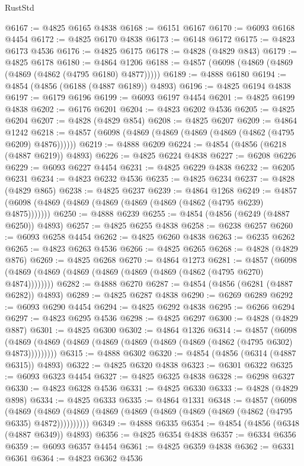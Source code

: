 \begin{lexlean}{RustStd}
\begin{coremodule}
@6167 := @4825 @6165 @4838
@6168 := @6151 @6167
@6170 := @6093 @6168 @4454
@6172 := @4825 @6170 @4838
@6173 := @6148 @6172
@6175 := @4823 @6173 @4536
@6176 := @4825 @6175
@6178 := @4828 (@4829 @843)
@6179 := @4825 @6178
@6180 := @4864 @1206
@6188 := @4857 (@6098 (@4869 (@4869 (@4869 (@4862 (@4795 @6180) @4877)))))
@6189 := @4888 @6180
@6194 := @4854 (@4856 (@6188 (@4887 @6189)) @4893)
@6196 := @4825 @6194 @4838
@6197 := @6179 @6196
@6199 := @6093 @6197 @4454
@6201 := @4825 @6199 @4838
@6202 := @6176 @6201
@6204 := @4823 @6202 @4536
@6205 := @4825 @6204
@6207 := @4828 (@4829 @854)
@6208 := @4825 @6207
@6209 := @4864 @1242
@6218 := @4857 (@6098 (@4869 (@4869 (@4869 (@4869 (@4862 (@4795 @6209) @4876))))))
@6219 := @4888 @6209
@6224 := @4854 (@4856 (@6218 (@4887 @6219)) @4893)
@6226 := @4825 @6224 @4838
@6227 := @6208 @6226
@6229 := @6093 @6227 @4454
@6231 := @4825 @6229 @4838
@6232 := @6205 @6231
@6234 := @4823 @6232 @4536
@6235 := @4825 @6234
@6237 := @4828 (@4829 @865)
@6238 := @4825 @6237
@6239 := @4864 @1268
@6249 := @4857 (@6098 (@4869 (@4869 (@4869 (@4869 (@4869 (@4862 (@4795 @6239) @4875)))))))
@6250 := @4888 @6239
@6255 := @4854 (@4856 (@6249 (@4887 @6250)) @4893)
@6257 := @4825 @6255 @4838
@6258 := @6238 @6257
@6260 := @6093 @6258 @4454
@6262 := @4825 @6260 @4838
@6263 := @6235 @6262
@6265 := @4823 @6263 @4536
@6266 := @4825 @6265
@6268 := @4828 (@4829 @876)
@6269 := @4825 @6268
@6270 := @4864 @1273
@6281 := @4857 (@6098 (@4869 (@4869 (@4869 (@4869 (@4869 (@4869 (@4862 (@4795 @6270) @4874))))))))
@6282 := @4888 @6270
@6287 := @4854 (@4856 (@6281 (@4887 @6282)) @4893)
@6289 := @4825 @6287 @4838
@6290 := @6269 @6289
@6292 := @6093 @6290 @4454
@6294 := @4825 @6292 @4838
@6295 := @6266 @6294
@6297 := @4823 @6295 @4536
@6298 := @4825 @6297
@6300 := @4828 (@4829 @887)
@6301 := @4825 @6300
@6302 := @4864 @1326
@6314 := @4857
    (@6098 (@4869 (@4869 (@4869 (@4869 (@4869 (@4869 (@4869 (@4862 (@4795 @6302) @4873)))))))))
@6315 := @4888 @6302
@6320 := @4854 (@4856 (@6314 (@4887 @6315)) @4893)
@6322 := @4825 @6320 @4838
@6323 := @6301 @6322
@6325 := @6093 @6323 @4454
@6327 := @4825 @6325 @4838
@6328 := @6298 @6327
@6330 := @4823 @6328 @4536
@6331 := @4825 @6330
@6333 := @4828 (@4829 @898)
@6334 := @4825 @6333
@6335 := @4864 @1331
@6348 := @4857
    (@6098
      (@4869 (@4869 (@4869 (@4869 (@4869 (@4869 (@4869 (@4869 (@4862 (@4795 @6335) @4872))))))))))
@6349 := @4888 @6335
@6354 := @4854 (@4856 (@6348 (@4887 @6349)) @4893)
@6356 := @4825 @6354 @4838
@6357 := @6334 @6356
@6359 := @6093 @6357 @4454
@6361 := @4825 @6359 @4838
@6362 := @6331 @6361
@6364 := @4823 @6362 @4536

\end{coremodule}
\end{lexlean}
